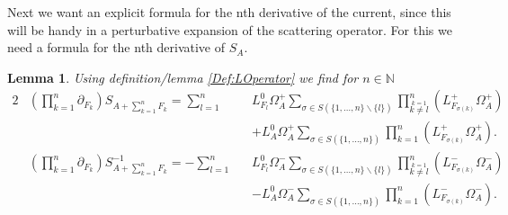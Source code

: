 \documentclass[oneside,reqno,12pt]{amsart}
\newtheorem{lemma}{Lemma}
\begin{document}
Next we want an explicit formula for the nth derivative of the current, since this will be handy in a perturbative expansion of the scattering operator. For this we need a formula for the nth derivative of \(S_A\). 
\begin{lemma}\label{lemma:nDerivativesSMatrix}
Using definition/lemma \ref{Def:LOperator} we find for \(n\in\mathbb{N}\)
\begin{alignat}{2}\tag*{}
&\left(\prod_{k=1}^n \partial_{F_k} \right) S_{A+\sum_{k=1}^n F_k} 
= \sum_{l=1}^n &&L^0_{F_l}\Omega^+_A  \sum_{\sigma \in S(\{1,\dots,n\}\backslash\{l\})} \prod_{\stackrel{k=1}{ k\neq l}}^n \left( L^+_{F_{\sigma(k)}} \Omega^+_{A}\right)\\
& &&+ L^0_{A} \Omega^+_A  \sum_{\sigma \in S(\{1,\dots,n\})} \prod_{k=1}^n \left(L^+_{F_{\sigma(k)}}\Omega^+_{A}\right).
\\
\tag*{}
&\left(\prod_{k=1}^n \partial_{F_k} \right) S^{-1}_{A+\sum_{k=1}^n F_k} 
= -\sum_{l=1}^n &&L^0_{F_l}\Omega^-_A  \sum_{\sigma \in S(\{1,\dots,n\}\backslash\{l\})} \prod_{\stackrel{k=1}{ k\neq l}}^n \left( L^-_{F_{\sigma(k)}} \Omega^-_{A}\right)\\
& &&- L^0_{A} \Omega^-_A  \sum_{\sigma \in S(\{1,\dots,n\})} \prod_{k=1}^n \left(L^-_{F_{\sigma(k)}}\Omega^-_{A}\right).
\end{alignat}
\end{lemma}
\end{document}
